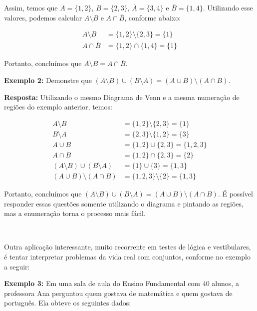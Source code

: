 Assim, temos que $A=\{1,2\}$, $B=\{2,3\}$, $\overline A=\{3,4\}$ e $\overline B=\{1,4\}$. Utilizando esse valores, podemos calcular $A \setminus B$ e $A \cap \overline B$, conforme abaixo:

\begin{equation*}
\begin{aligned}
  A \setminus B &= \{1,2\} \setminus \{2,3\} = \{1\}\\
  A \cap \overline B &= \{1,2\} \cap \{1,4\} = \{1\}
\end{aligned}
\end{equation*}

Portanto, concluímos que $A \setminus B = A \cap \overline B$.

\textbf{Exemplo 2:} Demonstre que $(A \setminus B) \cup (B \setminus A) = (A \cup B) \setminus (A \cap B)$.

\textbf{Resposta:} Utilizando o mesmo Diagrama de Venn e a mesma numeração de regiões do exemplo anterior, temos:

\begin{equation*}
\begin{aligned}
  A \setminus B &= \{1,2\} \setminus \{2,3\} = \{1\}\\
  B \setminus A &= \{2,3\} \setminus \{1,2\} = \{3\}\\
  A \cup B &= \{1,2\} \cup \{2,3\} = \{1,2,3\}\\
  A \cap B &= \{1,2\} \cap \{2,3\} = \{2\}\\
  (A \setminus B) \cup (B \setminus A) &= \{1\} \cup \{3\} = \{1,3\}\\
  (A \cup B) \setminus (A \cap B) &= \{1,2,3\} \setminus \{2\} = \{1,3\}
\end{aligned}
\end{equation*}

Portanto, concluímos que $(A \setminus B) \cup (B \setminus A) = (A \cup B) \setminus (A \cap B)$.
\newline
É possível responder essas questões somente utilizando o diagrama e pintando as regiões, mas a enumeração torna o processo mais fácil.

$\qquad$

Outra aplicação interessante, muito recorrente em testes de lógica e vestibulares, é tentar interpretar problemas da vida real com conjuntos, conforme no exemplo a seguir:

\textbf{Exemplo 3:} Em uma sala de aula do Ensino Fundamental com $40$ alunos, a professora Ana perguntou quem gostava de matemática e quem gostava de português. Ela obteve os seguintes dados:

